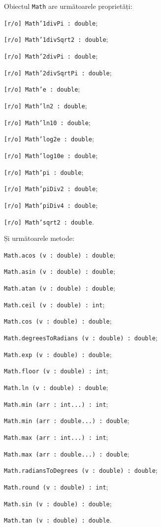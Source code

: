 Obiectul \texttt{Math} are următoarele proprietăți:
\begin{icItems}
	\item \texttt{[r/o] Math'1divPi : double};
	\item \texttt{[r/o] Math'1divSqrt2 : double};
	\item \texttt{[r/o] Math'2divPi : double};
	\item \texttt{[r/o] Math'2divSqrtPi : double};
	\item \texttt{[r/o] Math'e : double};
	\item \texttt{[r/o] Math'ln2 : double};
	\item \texttt{[r/o] Math'ln10 : double};
	\item \texttt{[r/o] Math'log2e : double};
	\item \texttt{[r/o] Math'log10e : double};
	\item \texttt{[r/o] Math'pi : double};
	\item \texttt{[r/o] Math'piDiv2 : double};
	\item \texttt{[r/o] Math'piDiv4 : double};
	\item \texttt{[r/o] Math'sqrt2 : double}.
\end{icItems}

Și următoarele metode:
\begin{icItems}
	\item \texttt{Math.acos (v : double) : double};
	\item \texttt{Math.asin (v : double) : double};
	\item \texttt{Math.atan (v : double) : double};
	\item \texttt{Math.ceil (v : double) : int};
	\item \texttt{Math.cos (v : double) : double};
	\item \texttt{Math.degreesToRadians (v : double) : double};
	\item \texttt{Math.exp (v : double) : double};
	\item \texttt{Math.floor (v : double) : int};
	\item \texttt{Math.ln (v : double) : double};
	\item \texttt{Math.min (arr : int...) : int};
	\item \texttt{Math.min (arr : double...) : double};
	\item \texttt{Math.max (arr : int...) : int};
	\item \texttt{Math.max (arr : double...) : double};
	\item \texttt{Math.radiansToDegrees (v : double) : double};
	\item \texttt{Math.round (v : double) : int};
	\item \texttt{Math.sin (v : double) : double};
	\item \texttt{Math.tan (v : double) : double}.
\end{icItems}

